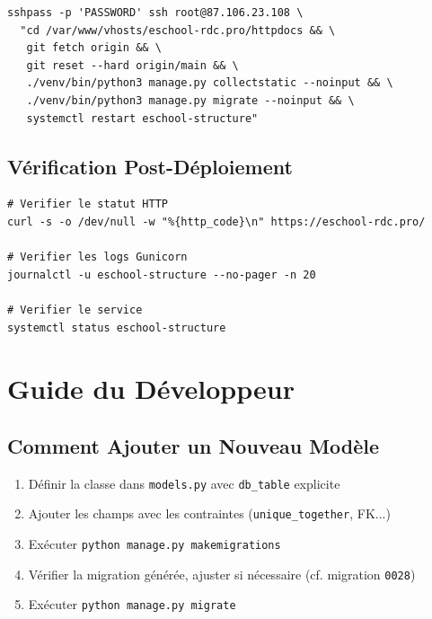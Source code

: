 \documentclass[12pt,a4paper,oneside]{report}
\begin{document}
\begin{lstlisting}[style=python, title=Commande de déploiement complète]
sshpass -p 'PASSWORD' ssh root@87.106.23.108 \
  "cd /var/www/vhosts/eschool-rdc.pro/httpdocs && \
   git fetch origin && \
   git reset --hard origin/main && \
   ./venv/bin/python3 manage.py collectstatic --noinput && \
   ./venv/bin/python3 manage.py migrate --noinput && \
   systemctl restart eschool-structure"
\end{lstlisting}

\section{Vérification Post-Déploiement}

\begin{lstlisting}[style=python, title=Commandes de vérification]
# Verifier le statut HTTP
curl -s -o /dev/null -w "%{http_code}\n" https://eschool-rdc.pro/

# Verifier les logs Gunicorn
journalctl -u eschool-structure --no-pager -n 20

# Verifier le service
systemctl status eschool-structure
\end{lstlisting}


\chapter{Guide du Développeur}

\section{Comment Ajouter un Nouveau Modèle}

\begin{enumerate}
  \item Définir la classe dans \texttt{models.py} avec \texttt{db\_table} explicite
  \item Ajouter les champs avec les contraintes (\texttt{unique\_together}, FK...)
  \item Exécuter \texttt{python manage.py makemigrations}
  \item Vérifier la migration générée, ajuster si nécessaire (cf. migration \texttt{0028})
  \item Exécuter \texttt{python manage.py migrate}
\end{enumerate}
\end{document}
